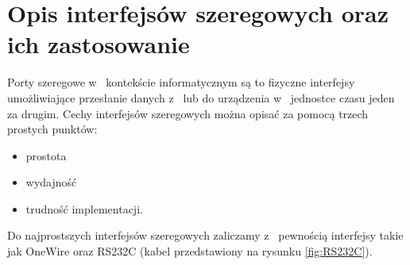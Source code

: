 \documentclass{BscUS}
\begin{document}
\section{Opis interfejsów szeregowych oraz ich zastosowanie}
\label{s:serialInterface}
\indent Porty szeregowe w~ kontekście informatycznym są to fizyczne interfejsy umożliwiające przesłanie danych z~ lub do urządzenia w~ jednostce czasu jeden za drugim. Cechy interfejsów szeregowych można opisać za pomocą trzech prostych punktów:
\begin{itemize}
\item prostota
\item wydajność
\item trudność implementacji.
\end{itemize}
Do najprostszych interfejsów szeregowych zaliczamy z~ pewnością interfejsy takie jak OneWire oraz RS232C (kabel przedstawiony na rysunku \ref{fig:RS232C}).
\end{document}

